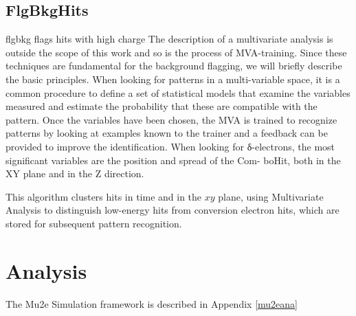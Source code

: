 \subsection{FlgBkgHits}
flgbkg flags hits with high charge
The description of a multivariate analysis is outside the scope of this work and so is the process
of MVA-training. Since these techniques are fundamental for the background flagging, we will briefly
describe the basic principles. When looking for patterns in a multi-variable space, it is a common
procedure to define a set of statistical models that examine the variables measured and estimate the
probability that these are compatible with the pattern. Once the variables have been chosen, the
MVA is trained to recognize patterns by looking at examples known to the trainer and a feedback can
be provided to improve the identification.
When looking for δ-electrons, the most significant variables are the position and spread of the Com-
boHit, both in the XY plane and in the Z direction.

This algorithm 
clusters hits in time and in the $xy$ plane, using 
Multivariate Analysis to distinguish low-energy 
hits from conversion electron hits, which are 
stored for subsequent pattern recognition.
\section{Analysis}
The Mu2e Simulation framework is described in Appendix \ref{mu2eana}
